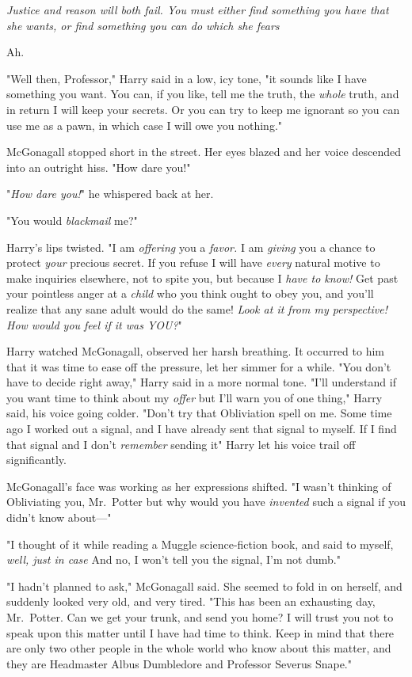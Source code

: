 \emph{Justice and reason will both fail. You must either find something you
have that she wants, or find something you can do which she fears{\el}}

Ah.

"Well then, Professor," Harry said in a low, icy tone, "it sounds like I have
something you want. You can, if you like, tell me the truth, the \emph{whole}
truth, and in return I will keep your secrets. Or you can try to keep me
ignorant so you can use me as a pawn, in which case I will owe you nothing."

McGonagall stopped short in the street. Her eyes blazed and her voice descended
into an outright hiss. "How dare you!"

"\emph{How dare you!}" he whispered back at her.

"You would \emph{blackmail} me?"

Harry's lips twisted. "I am \emph{offering} you a \emph{favor.} I am
\emph{giving} you a chance to protect \emph{your} precious secret. If you
refuse I will have \emph{every} natural motive to make inquiries elsewhere, not
to spite you, but because I \emph{have to know!} Get past your pointless anger
at a \emph{child} who you think ought to obey you, and you'll realize that any
sane adult would do the same! \emph{Look at it from my perspective! How would
you feel if it was YOU?}"

Harry watched McGonagall, observed her harsh breathing. It occurred to him that
it was time to ease off the pressure, let her simmer for a while. "You don't
have to decide right away," Harry said in a more normal tone. "I'll understand
if you want time to think about my \emph{offer}{\el} but I'll warn you of
one thing," Harry said, his voice going colder. "Don't try that Obliviation
spell on me. Some time ago I worked out a signal, and I have already sent that
signal to myself. If I find that signal and I don't \emph{remember} sending
it{\el}" Harry let his voice trail off significantly.

McGonagall's face was working as her expressions shifted. "I{\el} wasn't
thinking of Obliviating you, Mr.~Potter{\el} but why would you have
\emph{invented} such a signal if you didn't know about—"

"I thought of it while reading a Muggle science-fiction book, and said to
myself, \emph{well, just in case{\el}} And no, I won't tell you the signal,
I'm not dumb."

"I hadn't planned to ask," McGonagall said. She seemed to fold in on herself,
and suddenly looked very old, and very tired. "This has been an exhausting day,
Mr.~Potter. Can we get your trunk, and send you home? I will trust you not to
speak upon this matter until I have had time to think. Keep in mind that there
are only two other people in the whole world who know about this matter, and
they are Headmaster Albus Dumbledore and Professor Severus Snape."

